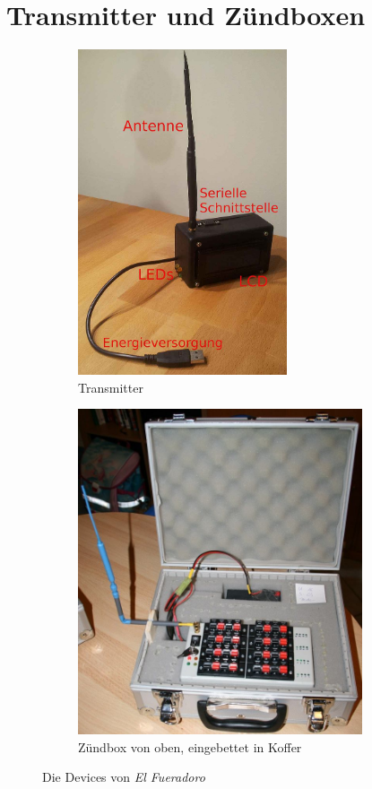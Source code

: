 \documentclass[paper=a4, parskip, numbers=noenddot, toc=listof, headsepline]{scrbook}
\newcommand{\anlage}{\emph{El Fueradoro}}
\begin{document}
		\section{Transmitter und Zündboxen}

			\begin{figure}
				\centering
				\begin{subfigure}[t]{0.405\textwidth}
					\includegraphics[height=96mm]{Bilder/Transmitter}
					\caption{Transmitter}
					\label{fig:transmitter}
				\end{subfigure}
				\begin{subfigure}[t]{0.55\textwidth}
					\includegraphics[height=96mm]{Bilder/DraufsichtZuendbox}
					\caption{Zündbox von oben, eingebettet in Koffer}
					\label{fig:zuendbox}
				\end{subfigure}
				\caption{Die Devices von {\anlage}}
			\end{figure}
\end{document}
